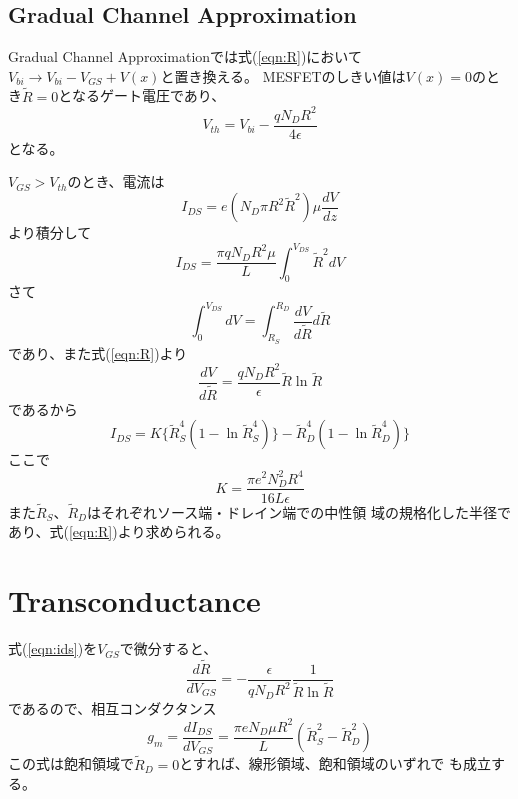 \documentclass[11pt,uplatex]{jsarticle}
\def\d#1#2{\frac{d #1}{d #2}}
\begin{document}
\subsection{Gradual Channel Approximation}
Gradual Channel Approximationでは式(\ref{eqn:R})において$V_{bi}\to
V_{bi}-V_{GS}+V(x)$と置き換える。
MESFETのしきい値は$V(x)=0$のとき$\tilde{R}=0$となるゲート電圧であり、
\begin{equation}
 V_{th}=V_{bi}-\frac{q N_D R^2}{4 \epsilon}
\end{equation}
となる。

$V_{GS}>V_{th}$のとき、電流は
\begin{equation}
 I_{DS}=e (N_D \pi R^2 \tilde{R}^2) \mu \d{V}{z}
\end{equation}
より積分して
\begin{equation}
 I_{DS}=\frac{\pi q N_D R^2 \mu}{L}\int_0^{V_{DS}} \tilde{R}^2 dV
\end{equation}
さて
\begin{equation}
 \int_0^{V_{DS}} dV = \int_{R_S}^{R_D} \d{V}{\tilde{R}} d\tilde{R}
\end{equation}
であり、また式(\ref{eqn:R})より
\begin{equation}
 \d{V}{\tilde{R}} = \frac{q N_D R^2}{\epsilon} \tilde{R} \ln\tilde{R}
\end{equation}
であるから
\begin{equation}
I_{DS} = K \{\tilde{R}_S^4(1-\ln \tilde{R}_S^4)\} - \tilde{R}_D^4(1-\ln\tilde{R}_D^4)\}\label{eqn:ids}
\end{equation}
ここで
\begin{equation}
 K=\frac{\pi e^2 N_D^2 R^4}{16 L \epsilon}
\end{equation}
また$\tilde{R}_S$、$\tilde{R}_D$はそれぞれソース端・ドレイン端での中性領
域の規格化した半径であり、式(\ref{eqn:R})より求められる。
\section{Transconductance}
式(\ref{eqn:ids})を$V_{GS}$で微分すると、
\begin{equation}
 \d{\tilde{R}}{V_{GS}} = - \frac{\epsilon}{q N_D R^2} \frac{1}{\tilde{R}
  \ln \tilde{R}}
\end{equation}
であるので、相互コンダクタンス
\begin{equation}
 g_m =\d{I_{DS}}{V_{GS}}= \frac{\pi e N_D \mu R^2}{L} (\tilde{R}_S^2 - \tilde{R}_D^2)
\end{equation}
この式は飽和領域で$\tilde{R}_D=0$とすれば、線形領域、飽和領域のいずれで
も成立する。
\end{document}
